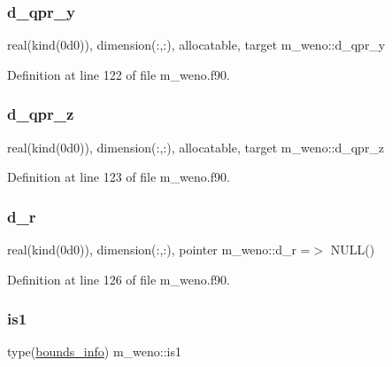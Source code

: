\subsubsection{\texorpdfstring{d\+\_\+qpr\+\_\+y}{d\_qpr\_y}}
{\footnotesize\ttfamily real(kind(0d0)), dimension(\+:,\+:), allocatable, target m\+\_\+weno\+::d\+\_\+qpr\+\_\+y}



Definition at line 122 of file m\+\_\+weno.\+f90.

\mbox{\label{namespacem__weno_ae1cbc7d2a0f6da59401e7a15dff4c2fc}} 
\subsubsection{\texorpdfstring{d\+\_\+qpr\+\_\+z}{d\_qpr\_z}}
{\footnotesize\ttfamily real(kind(0d0)), dimension(\+:,\+:), allocatable, target m\+\_\+weno\+::d\+\_\+qpr\+\_\+z}



Definition at line 123 of file m\+\_\+weno.\+f90.

\mbox{\label{namespacem__weno_a587c6a49c1eb9f3d35be2735a56edd01}} 
\subsubsection{\texorpdfstring{d\+\_\+r}{d\_r}}
{\footnotesize\ttfamily real(kind(0d0)), dimension(\+:,\+:), pointer m\+\_\+weno\+::d\+\_\+r =$>$ N\+U\+LL()}



Definition at line 126 of file m\+\_\+weno.\+f90.

\mbox{\label{namespacem__weno_ac3ef0890373b2575a3bd9ed112c31865}} 
\subsubsection{\texorpdfstring{is1}{is1}}
{\footnotesize\ttfamily type(\hyperlink{structm__derived__types_1_1bounds__info}{bounds\+\_\+info}) m\+\_\+weno\+::is1}



